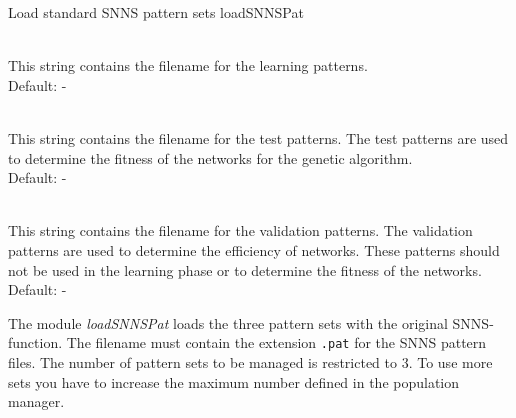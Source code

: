 \begin{moduledoc}{Load standard SNNS pattern sets}
                 {loadSNNSPat}
  \item[\KeyWord{learnpattern} \optParam{ x } ]~\\
    This string contains the filename for the learning patterns.\\ 
    Default: - 
  \item[\KeyWord{testpattern} \optParam{ x } ]~\\
    This string contains the filename for the test patterns.
    The test patterns are used to determine the fitness of the networks for the
    genetic algorithm.\\ 
    Default: -
  \item[\KeyWord{crosspattern} \optParam{ x } ]~\\
    This string contains the filename for the validation patterns.
    The validation patterns are used to determine the efficiency of networks.
    These patterns should not be used in the learning phase or to determine
    the fitness of the networks.\\ 
    Default: -
\end{moduledoc}
The module {\it loadSNNSPat} loads the three pattern sets with the
original SNNS-function.
The filename must contain the extension {\tt .pat} for the 
SNNS pattern files.
The number of pattern sets to be managed is restricted to 3.
To use more sets you have to increase the maximum number defined in
the population manager.


